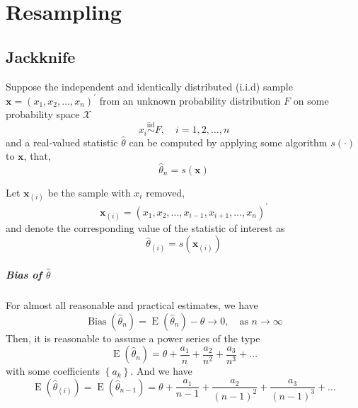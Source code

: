 \chapter{Resampling}

\section{Jackknife}

Suppose the independent and identically distributed (i.i.d) sample $\boldsymbol{x}=\left(x_{1},x_{2},\ldots,x_{n}\right)^{\prime}$ from an unknown probability distribution $F$ on some probability space $\mathcal{X}$
\begin{equation}
    x_{i}\stackrel{\text{iid}}{\sim}F,\quad i=1,2,\ldots,n
\end{equation}
and a real-valued statistic $\hat{\theta}$ can be computed by applying some algorithm $s(\cdot)$ to $\mathbf{x}$, that,
\begin{equation}
    \hat{\theta}_{n}=s(\mathbf{x})
\end{equation}

Let $\mathbf{x}_{(i)}$ be the sample with $x_{i}$ removed,
\begin{equation}
    \mathbf{x}_{(i)}=\left(x_{1},x_{2},\ldots,x_{i-1},x_{i+1},\ldots,x_{n}\right)^{\prime}
\end{equation}
and denote the corresponding value of the statistic of interest as
\begin{equation}
    \hat{\theta}_{(i)}=s\left(\mathbf{x}_{(i)}\right)
\end{equation}

\paragraph{Bias of $\hat{\theta}$}

For almost all reasonable and practical estimates, we have \begin{equation}
    \operatorname{Bias}(\hat{\theta}_{n})=\operatorname{E}(\hat{\theta}_{n})-\theta\rightarrow 0,\quad\text{as }n\rightarrow\infty
\end{equation}
Then, it is reasonable to assume a power series of the type
\begin{equation}
    \operatorname{E}(\hat{\theta}_{n})=\theta+\frac{a_{1}}{n}+\frac{a_{2}}{n^{2}}+\frac{a_{3}}{n^{3}}+\ldots
\end{equation}
with some coefficients $\left\{a_{k}\right\}$. And we have
\begin{equation}
    \operatorname{E}(\hat{\theta}_{(i)})=\operatorname{E}(\hat{\theta}_{n-1})=\theta+\frac{a_{1}}{n-1}+\frac{a_{2}}{\left(n-1\right)^{2}}+\frac{a_{3}}{\left(n-1\right)^{3}}+\ldots
\end{equation}


